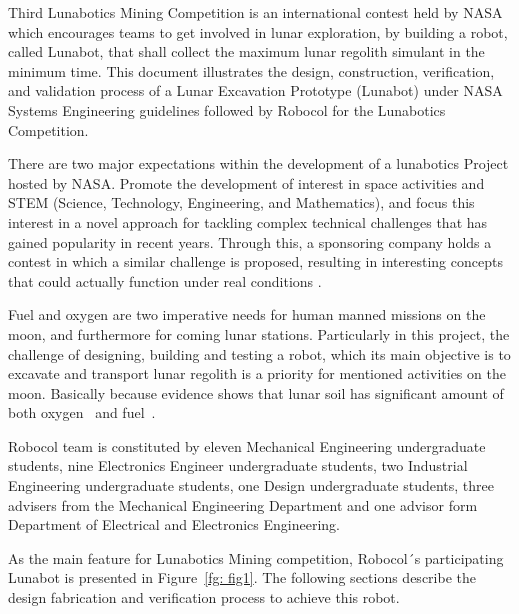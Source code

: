 \documentclass[conference]{IEEEtran}
\begin{document}
Third Lunabotics Mining Competition  is an international contest held by NASA which encourages teams to get involved in lunar exploration, by building a robot, called Lunabot, that shall collect the maximum lunar regolith simulant in the minimum time. This document illustrates the design, construction, verification, and validation process of a Lunar Excavation Prototype (Lunabot) under NASA Systems Engineering guidelines \cite{NASASysEng1995} followed by Robocol  for the Lunabotics Competition.

There are two major expectations within the development of a lunabotics Project hosted by NASA. Promote the development of interest in space activities and STEM (Science, Technology, Engineering, and Mathematics), and focus this interest in a novel approach for tackling complex technical challenges that has gained popularity in recent years. Through this, a sponsoring company holds a contest in which a similar challenge is proposed, resulting in interesting concepts that could actually function under real conditions \cite{NASArules2012}.

Fuel and oxygen are two imperative needs for human manned missions on the moon, and furthermore for coming lunar stations.  Particularly in this project, the challenge of designing, building and testing a robot, which its main objective is to excavate and transport lunar regolith is a priority for mentioned activities on the moon. Basically because evidence shows that lunar soil has significant amount of both oxygen~\cite{wiechert2001oxy} and fuel~\cite{Wittenberg1986}. 

Robocol  team is constituted by eleven Mechanical Engineering undergraduate students, nine Electronics Engineer undergraduate students, two Industrial Engineering undergraduate students, one Design undergraduate students, three  advisers from the Mechanical Engineering Department and one advisor form Department of Electrical and Electronics Engineering.

As the main feature for Lunabotics Mining competition, Robocol´s participating Lunabot  is presented in Figure~\ref{fg: fig1}.  The following sections describe the design fabrication and verification process to achieve this robot. 
\end{document}

